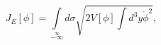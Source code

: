 \begin{equation}\label{Eac}J_E[\phi]=\int
\limits_{-\infty}\limits^{\infty}\!\!d\sigma\sqrt{2V[\phi]\int\!
d^3y\dot{\phi}^2 },\label{Ev}\end{equation} 
